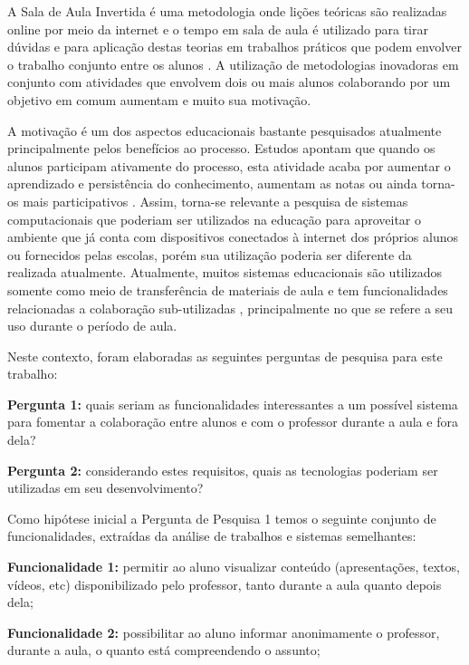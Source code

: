 A Sala de Aula Invertida é uma metodologia onde lições teóricas são realizadas online por meio da internet e o tempo em sala de aula é utilizado para tirar dúvidas e para aplicação destas teorias em trabalhos práticos que podem envolver o trabalho conjunto entre os alunos \cite{staker_classifying_2012}. A utilização de metodologias inovadoras em conjunto com atividades que envolvem dois ou mais alunos colaborando por um objetivo em comum aumentam e muito sua motivação.

A motivação é um dos aspectos educacionais bastante pesquisados atualmente principalmente pelos benefícios ao processo. Estudos apontam que quando os alunos participam ativamente do processo, esta atividade acaba por aumentar o aprendizado e persistência do conhecimento, aumentam as notas ou ainda torna-os mais participativos \cite{felder1992quick}. Assim, torna-se relevante a pesquisa de sistemas computacionais que poderiam ser utilizados na educação para aproveitar o ambiente que já conta com dispositivos conectados à internet dos próprios alunos ou fornecidos pelas escolas, porém sua utilização poderia ser diferente da realizada atualmente. Atualmente, muitos sistemas educacionais são utilizados somente como meio de transferência de materiais de aula e tem funcionalidades relacionadas a colaboração sub-utilizadas \cite{felder1992quick}, principalmente no que se refere a seu uso durante o período de aula.


Neste contexto, foram elaboradas as seguintes perguntas de pesquisa para este trabalho:

\textbf{Pergunta 1:} quais seriam as funcionalidades interessantes a um possível sistema para fomentar a colaboração entre alunos e com o professor durante a aula e fora dela?

\textbf{Pergunta 2:} considerando estes requisitos, quais as tecnologias poderiam ser utilizadas em seu desenvolvimento?

Como hipótese inicial a Pergunta de Pesquisa 1 temos o seguinte conjunto de funcionalidades, extraídas da análise de trabalhos e sistemas semelhantes:

\textbf{Funcionalidade 1:} permitir ao aluno visualizar conteúdo (apresentações, textos, vídeos, etc) disponibilizado pelo professor, tanto durante a aula quanto depois dela;

\textbf{Funcionalidade 2:} possibilitar ao aluno informar anonimamente o professor, durante a aula, o quanto está compreendendo o assunto;


